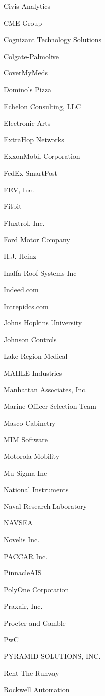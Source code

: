 \documentclass[twoside]{article}
\begin{document}
\begin{center}
\begin{multicols}{5}
\begin{FlushLeft}
\begin{compactitem}
\item Civis Analytics
\item CME Group
\item Cognizant Technology Solutions
\item Colgate-Palmolive
\item CoverMyMeds
\item Domino's Pizza
\item Echelon Consulting, LLC
\item Electronic Arts
\item ExtraHop Networks
\item ExxonMobil Corporation
\item FedEx SmartPost
\item FEV, Inc.
\item Fitbit
\item Fluxtrol, Inc.
\item Ford Motor Company
\item H.J. Heinz
\item Inalfa Roof Systems Inc
\item \url{Indeed.com}
\item \url{Intrepidcs.com}
\item Johns Hopkins University
\item Johnson Controls
\item Lake Region Medical
\item MAHLE Industries
\item Manhattan Associates, Inc.
\item Marine Officer Selection Team
\item Masco Cabinetry
\item MIM Software
\item Motorola Mobility
\item Mu Sigma Inc
\item National Instruments
\item Naval Research Laboratory
\item NAVSEA
\item Novelis Inc.
\item PACCAR Inc.
\item PinnacleAIS
\item PolyOne Corporation
\item Praxair, Inc.
\item Procter and Gamble
\item PwC
\item PYRAMID SOLUTIONS, INC.
\item Rent The Runway
\item Rockwell Automation

\end{compactitem}
\end{FlushLeft}
\end{multicols}
\end{center}
\end{document}
